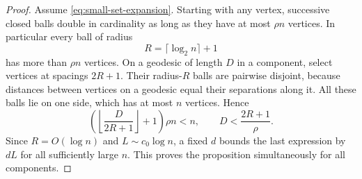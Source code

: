 \begin{proof}
Assume \eqref{eq:small-set-expansion}.  Starting with any vertex,
successive closed balls double in cardinality as long as they have
at most \(\rho n\) vertices.  In particular every ball of radius
\[
 R=\lceil\log_2 n\rceil+1
\]
has more than \(\rho n\) vertices.  On a geodesic of length \(D\)
in a component, select vertices at spacings \(2R+1\).  Their
radius-\(R\) balls are pairwise disjoint, because distances between
vertices on a geodesic equal their separations along it.  All these
balls lie on one side, which has at most \(n\) vertices.  Hence
\[
 \left(\left\lfloor\frac D{2R+1}\right\rfloor+1\right)\rho n<n,
 \qquad D<\frac{2R+1}{\rho}.
\]
Since \(R=O(\log n)\) and \(L\sim c_0\log n\), a fixed
\(d\) bounds the last expression by \(dL\) for all sufficiently
large \(n\).  This proves the proposition simultaneously for all
components.
\end{proof}
